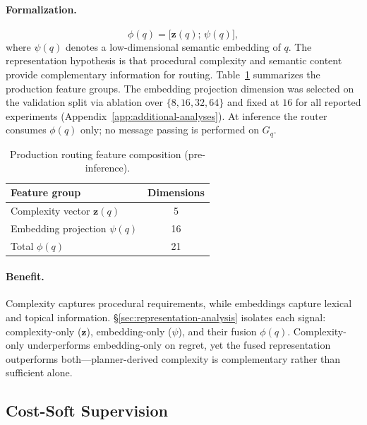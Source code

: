 \paragraph{Formalization.}
\begin{equation}
  \phi(q)=\big[\mathbf{z}(q);\,\psi(q)\big],
  \label{eq:method-phi}
\end{equation}
where $\psi(q)$ denotes a low-dimensional semantic embedding of $q$.
The representation hypothesis is that procedural complexity and semantic content provide
complementary information for routing.
Table~\ref{tab:feature-composition} summarizes the production feature groups.
The embedding projection dimension was selected on the validation split via ablation over
$\{8,16,32,64\}$ and fixed at $16$ for all reported experiments
(Appendix~\ref{app:additional-analyses}).
At inference the router consumes $\phi(q)$ only; no message passing is performed on $G_q$.

\begin{table}[t]
  \centering
  \caption{Production routing feature composition (pre-inference).}
  \label{tab:feature-composition}
  \begin{tabular}{lc}
    \toprule
    Feature group & Dimensions \\
    \midrule
    Complexity vector $\mathbf{z}(q)$ & 5 \\
    Embedding projection $\psi(q)$ & 16 \\
    Total $\phi(q)$ & 21 \\
    \bottomrule
  \end{tabular}
\end{table}

\paragraph{Benefit.}
Complexity captures procedural requirements, while embeddings capture lexical and topical
information.
\S\ref{sec:representation-analysis} isolates each signal: complexity-only ($\mathbf{z}$),
embedding-only ($\psi$), and their fusion $\phi(q)$.
Complexity-only underperforms embedding-only on regret, yet the fused representation
outperforms both---planner-derived complexity is complementary rather than sufficient alone.

\subsection{Cost-Soft Supervision}
\label{sec:method-supervision}

